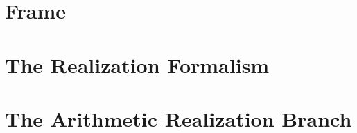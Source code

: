 \documentclass[11pt]{memoir}
\begin{document}
\tableofcontents

\mainmatter

\part*{Frame}


\part{The Realization Formalism}


\part{The Arithmetic Realization Branch}
\end{document}
